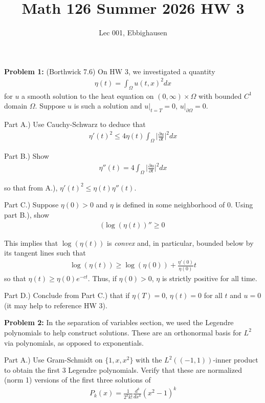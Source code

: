 \documentclass{article}
\title{Math 126 Summer 2026 HW 3}
\author{Lec 001, Ebbighausen}
\newcommand{\pd}{\partial}
\begin{document}
	\pagestyle{fancy}
	\fancyfoot{} 
	
	\maketitle
	
	\textbf{Problem 1:} (Borthwick 7.6) On HW 3, we investigated a quantity
	\begin{align*}
		\eta(t) = \int_{\Omega} u(t,x)^{2} dx
	\end{align*}
	for $u$ a smooth solution to the heat equation on $(0,\infty) \times \Omega$ with bounded $C^{1}$ domain $\Omega$. Suppose $u$ is such a solution and $u|_{t=T} = 0$, $u|_{\pd \Omega} = 0$. 
	
	Part A.) Use Cauchy-Schwarz to deduce that 
	\begin{align*}
		\eta'(t)^{2} \leq 4 \eta(t) \int_{\Omega} \lvert \frac{\pd u}{\pd t} \rvert^{2} dx
	\end{align*}
	
	Part B.) Show 
	\begin{align*}
		\eta''(t) = 4 \int_{\Omega} \lvert \frac{\pd u}{\pd t} \rvert^{2} dx
	\end{align*}
	
	so that from A.), $\eta'(t)^{2} \leq \eta(t) \eta''(t)$. 
	
	
	Part C.) Suppose $\eta(0) > 0$ and $\eta$ is defined in some neighborhood of $0$. Using part B.), show 
	\begin{align*}
		(\log(\eta(t)) '' \geq 0
	\end{align*}
	
	This implies that $\log(\eta(t))$ is \textit{convex} and, in particular, bounded below by its tangent lines such that 
	\begin{align*}
		\log(\eta(t)) \geq \log(\eta(0)) + \frac{\eta'(0)}{\eta(0)}t
	\end{align*}
	so that $\eta(t) \geq \eta(0) e^{-ct}$. Thus, if $\eta(0)>0$, $\eta$ is strictly positive for all time. 
	
	Part D.) Conclude from Part C.) that if $\eta(T) = 0$, $\eta(t) = 0$ for all $t$ and $u=0$ (it may help to reference HW 3). 
	
	\textbf{Problem 2:} In the separation of variables section, we used the Legendre polynomials to help construct solutions. These are an orthonormal basis for $L^{2}$ via polynomials, as opposed to exponentials. 
	
	Part A.) Use Gram-Schmidt on $\{1,x,x^{2}\}$ with the $L^{2}((-1,1))$-inner product to obtain the first 3 Legendre polynomials. Verify that these are normalized (norm 1) versions of the first three solutions of 
	\begin{align*}
		P_{k}(x) = \frac{1}{2^{k}k!} \frac{d^{k}}{dx^{k}}(x^{2}-1)^{k}
	\end{align*}
	
\end{document}
